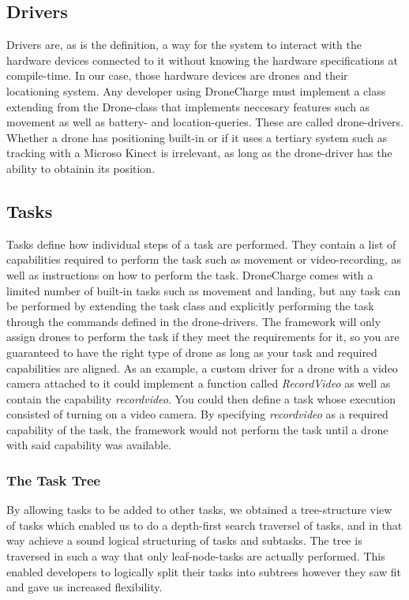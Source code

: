 \subsection{Drivers}
Drivers are, as is the definition, a way for the system to interact with the hardware devices connected to it without knowing the hardware specifications at compile-time. In our case, those hardware devices are drones and their locationing system. Any developer using DroneCharge must implement a class extending from the Drone-class that implements neccesary features such as movement as well as battery- and location-queries. These are called drone-drivers. Whether a drone has positioning built-in or if it uses a tertiary system such as tracking with a Microso Kinect is irrelevant, as long as the drone-driver has the ability to obtainin its position.

\subsection{Tasks}
Tasks define how individual steps of a task are performed. They contain a list of capabilities required to perform the task such as movement or video-recording, as well as instructions on how to perform the task. DroneCharge comes with a limited number of built-in tasks such as movement and landing, but any task can be performed by extending the task class and explicitly performing the task through the commands defined in the drone-drivers. The framework will only assign drones to perform the task if they meet the requirements for it, so you are guaranteed to have the right type of drone as long as your task and required capabilities are aligned. As an example, a custom driver for a drone with a video camera attached to it could implement a function called \textit{RecordVideo} as well as contain the capability \textit{recordvideo}. You could then define a task whose execution consisted of turning on a video camera. By specifying \textit{recordvideo} as a required capability of the task, the framework would not perform the task until a drone with said capability was available.
\subsubsection{The Task Tree}
By allowing tasks to be added to other tasks, we obtained a tree-structure view of tasks which enabled us to do a depth-first search traversel of tasks, and in that way achieve a sound logical structuring of tasks and subtasks. The tree is traversed in such a way that only leaf-node-tasks are actually performed. This enabled developers to logically split their tasks into subtrees however they saw fit and gave us increased flexibility.

